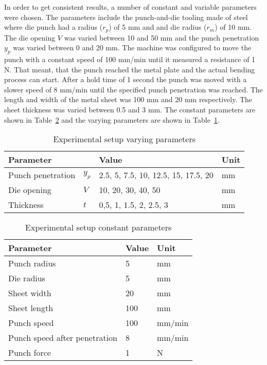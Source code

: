 In order to get consistent results, a number of constant and variable parameters were chosen.
The parameters include the punch-and-die tooling made of steel where die punch had a radius ($r_p$) of 5 mm and and die radius ($r_m$) of 10 mm. The die opening $V$ was varied between 10 and 50 mm and the punch penetration $y_p$ was varied between 0 and 20 mm.
The machine was configured to move the punch with a constant speed of 100 mm/min until it measured a resistance of 1 N. That meant, that the punch reached the metal plate and the actual bending process can start. After a hold time of 1 second the punch was moved with a slower speed of 8 mm/min until the specified punch penetration was reached.
The length and width of the metal sheet was 100 mm and 20 mm respectively. The sheet thickness was varied between 0.5 and 3 mm.
The constant parameters are shown in Table~\ref{tab:constant_parameters} and the varying parameters are shown in Table~\ref{tab:varying_parameters}.

\begin{table}[H]
    \centering
    \begin{tabular}{|l|l|l|l|}
        \hline
        \textbf{Parameter} & \textbf{} & \textbf{Value}                      & \textbf{Unit} \\ \hline
        Punch penetration  & $y_p$     & 2.5, 5, 7.5, 10, 12.5, 15, 17.5, 20 & mm            \\
        Die opening        & $V$       & 10, 20, 30, 40, 50                  & mm            \\
        Thickness          & $t$       & 0,5, 1, 1.5, 2, 2.5, 3              & mm            \\
        \hline
    \end{tabular}
    \caption{Experimental setup varying parameters}
    \label{tab:varying_parameters}
\end{table}

\begin{table}[H]
    \centering
    \begin{tabular}{|l|l|l|}
        \hline
        \textbf{Parameter}            & \textbf{Value} & \textbf{Unit} \\ \hline
        Punch radius                  & 5              & mm            \\
        Die radius                    & 5              & mm            \\
        Sheet width                   & 20             & mm            \\
        Sheet length                  & 100            & mm            \\
        Punch speed                   & 100            & mm/min        \\
        Punch speed after penetration & 8              & mm/min        \\
        Punch force                   & 1              & N             \\
        \hline
    \end{tabular}
    \caption{Experimental setup constant parameters}
    \label{tab:constant_parameters}
\end{table}






